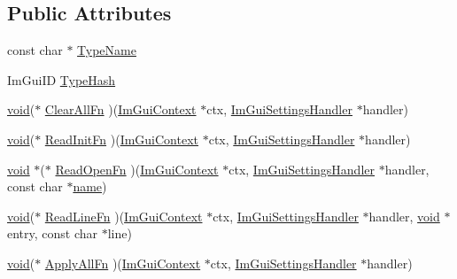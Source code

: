 \subsection*{Public Attributes}
\begin{DoxyCompactItemize}
\item 
const char $\ast$ \hyperlink{structImGuiSettingsHandler_a2b2821603e32a669c855dd97757c83c8}{Type\+Name}
\item 
Im\+Gui\+ID \hyperlink{structImGuiSettingsHandler_ac2dd47bdb91ae6f50afb5ac14222b552}{Type\+Hash}
\item 
\hyperlink{imgui__impl__opengl3__loader_8h_ac668e7cffd9e2e9cfee428b9b2f34fa7}{void}($\ast$ \hyperlink{structImGuiSettingsHandler_a36355b915f61f94d90ba3f819fa02df0}{Clear\+All\+Fn} )(\hyperlink{structImGuiContext}{Im\+Gui\+Context} $\ast$ctx, \hyperlink{structImGuiSettingsHandler}{Im\+Gui\+Settings\+Handler} $\ast$handler)
\item 
\hyperlink{imgui__impl__opengl3__loader_8h_ac668e7cffd9e2e9cfee428b9b2f34fa7}{void}($\ast$ \hyperlink{structImGuiSettingsHandler_a27706c3cad4a51af70dc2ebc5d3737d4}{Read\+Init\+Fn} )(\hyperlink{structImGuiContext}{Im\+Gui\+Context} $\ast$ctx, \hyperlink{structImGuiSettingsHandler}{Im\+Gui\+Settings\+Handler} $\ast$handler)
\item 
\hyperlink{imgui__impl__opengl3__loader_8h_ac668e7cffd9e2e9cfee428b9b2f34fa7}{void} $\ast$($\ast$ \hyperlink{structImGuiSettingsHandler_accadc3cc1599382b55b58dac53df0b24}{Read\+Open\+Fn} )(\hyperlink{structImGuiContext}{Im\+Gui\+Context} $\ast$ctx, \hyperlink{structImGuiSettingsHandler}{Im\+Gui\+Settings\+Handler} $\ast$handler, const char $\ast$\hyperlink{imgui__impl__opengl3__loader_8h_a5c4947d4516dd7cfa3505ce3a648a4ef}{name})
\item 
\hyperlink{imgui__impl__opengl3__loader_8h_ac668e7cffd9e2e9cfee428b9b2f34fa7}{void}($\ast$ \hyperlink{structImGuiSettingsHandler_a0a02bad8569c2d9f22e1a532d1e2de60}{Read\+Line\+Fn} )(\hyperlink{structImGuiContext}{Im\+Gui\+Context} $\ast$ctx, \hyperlink{structImGuiSettingsHandler}{Im\+Gui\+Settings\+Handler} $\ast$handler, \hyperlink{imgui__impl__opengl3__loader_8h_ac668e7cffd9e2e9cfee428b9b2f34fa7}{void} $\ast$entry, const char $\ast$line)
\item 
\hyperlink{imgui__impl__opengl3__loader_8h_ac668e7cffd9e2e9cfee428b9b2f34fa7}{void}($\ast$ \hyperlink{structImGuiSettingsHandler_a65f1fb45621d42fffcdec7dd09312c20}{Apply\+All\+Fn} )(\hyperlink{structImGuiContext}{Im\+Gui\+Context} $\ast$ctx, \hyperlink{structImGuiSettingsHandler}{Im\+Gui\+Settings\+Handler} $\ast$handler)

\end{DoxyCompactItemize}
